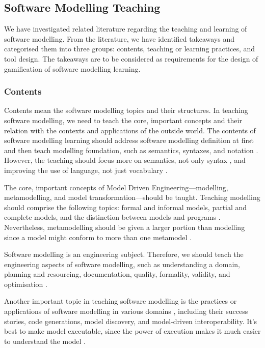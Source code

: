 \documentclass[12pt, a4paper]{report}
\begin{document}
{\subsection{Software Modelling Teaching}
\label{Software Modelling Teaching}
We have investigated related literature regarding the teaching and learning of software modelling. From the literature, we have identified takeaways and categorised them into three groups: contents, teaching or learning practices, and tool design. The takeaways are to be considered as requirements for the design of gamification of software modelling learning. 

\subsubsection{Contents}
Contents mean the software modelling topics and their structures. In teaching software modelling, we need to teach the core, important concepts and their relation with the contexts and applications of the outside world. The contents of software modelling learning should address software modelling definition at first \cite{borstler2012teaching} and then teach modelling foundation, such as semantics, syntaxes, and notation \cite{borstler2012teaching}. However, the teaching should focus more on semantics, not only syntax \cite{borstler2012teaching}, and improving the use of language, not just vocabulary \cite{bezivin2009teaching}. 

The core, important concepts of Model Driven Engineering---modelling, metamodelling, and model transformation---should be taught. Teaching modelling should comprise the following topics: formal and informal models, partial and complete models, and the distinction between models and programs \cite{bezivin2009teaching}. Nevertheless, metamodelling should be given a larger portion than modelling since a model might conform to more than one metamodel \cite{ober2007teaching}. 

Software modelling is an engineering subject. Therefore, we should teach the engineering aspects of software modelling, such as understanding a domain, planning and resourcing, documentation, quality, formality, validity, and optimisation \cite{paige2014bad}.

Another important topic in teaching software modelling is the practices or applications of software modelling in various domains \cite{ borstler2012teaching, paige2014bad}, including their success stories, code generations, model discovery, and model-driven interoperability. It's best to make model executable, since the power of execution makes it much easier to understand the model \cite{bezivin2009teaching}.

}
\end{document}
